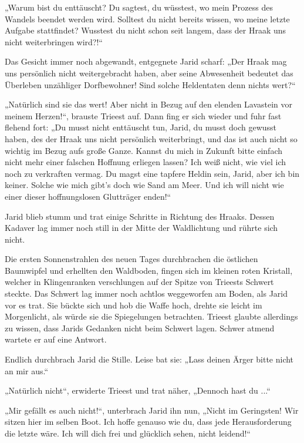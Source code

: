 „Warum bist du enttäuscht? Du sagtest, du wüsstest, wo mein Prozess des Wandels beendet werden wird. Solltest du nicht bereits wissen, wo meine letzte Aufgabe stattfindet? Wusstest du nicht schon seit langem, dass der Hraak uns nicht weiterbringen wird?!“

Das Gesicht immer noch abgewandt, entgegnete Jarid scharf: „Der Hraak mag uns persönlich nicht weitergebracht haben, aber seine Abwesenheit bedeutet das Überleben unzähliger Dorfbewohner! Sind solche Heldentaten denn nichts wert?“

„Natürlich sind sie das wert! Aber nicht in Bezug auf den elenden Lavastein vor meinem Herzen!“, brauste Trieest auf. Dann fing er sich wieder und fuhr fast flehend fort: „Du musst nicht enttäuscht tun, Jarid, du musst doch gewusst haben, des der Hraak uns nicht persönlich weiterbringt, und das ist auch nicht so wichtig im Bezug aufs große Ganze. Kannst du mich in Zukunft bitte einfach nicht mehr einer falschen Hoffnung erliegen lassen? Ich weiß nicht, wie viel ich noch zu verkraften vermag. Du magst eine tapfere Heldin sein, Jarid, aber ich bin keiner. Solche wie mich gibt’s doch wie Sand am Meer. Und ich will nicht wie einer dieser hoffnungslosen Glutträger enden!“

Jarid blieb stumm und trat einige Schritte in Richtung des Hraaks. Dessen Kadaver lag immer noch still in der Mitte der Waldlichtung und rührte sich nicht.

Die ersten Sonnenstrahlen des neuen Tages durchbrachen die östlichen Baumwipfel und erhellten den Waldboden, fingen sich im kleinen roten Kristall, welcher in Klingenranken verschlungen auf der Spitze von Trieests Schwert steckte. Das Schwert lag immer noch achtlos weggeworfen am Boden, als Jarid vor es trat. Sie bückte sich und hob die Waffe hoch, drehte sie leicht im Morgenlicht, als würde sie die Spiegelungen betrachten. Trieest glaubte allerdings zu wissen, dass Jarids Gedanken nicht beim Schwert lagen. Schwer atmend wartete er auf eine Antwort.

Endlich durchbrach Jarid die Stille. Leise bat sie: „Lass deinen Ärger bitte nicht an mir aus.“

„Natürlich nicht“, erwiderte Trieest und trat näher, „Dennoch hast du ...“

„Mir gefällt es auch nicht!“, unterbrach Jarid ihn nun, „Nicht im Geringsten! Wir sitzen hier im selben Boot. Ich hoffe genauso wie du, dass jede Herausforderung die letzte wäre. Ich will dich frei und glücklich sehen, nicht leidend!“

